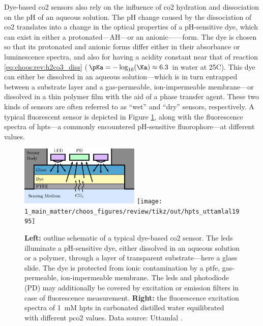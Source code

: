 Dye-based \gls{co2} sensors also rely on the influence of \gls{co2} hydration and dissociation on the pH of an aqueous solution. The pH change caused by the dissociation of \gls{co2} translates into a change in the optical properties of a pH-sensitive dye, which can exist in either a protonated---AH---or an anionic------form. The dye is chosen so that its protonated and anionic forms differ either in their absorbance or luminescence spectra, and also for having a \Ka{} acidity constant near that of reaction \ref{eq:choos:rev:h2co3_diss} ($\pKa=-\log_{10}(\Ka)\approx6.3$ in water at 25{\degree}C\cite{macinnes1933}). This dye can either be dissolved in an aqueous solution---which is in turn entrapped between a substrate layer and a gas-permeable, ion-impermeable membrane---or dissolved in a thin polymer film with the aid of a phase transfer agent. These two kinds of sensors are often referred to as \enquote{wet} and \enquote{dry} sensors, respectively. A typical fluorescent sensor is depicted in Figure \ref{fig:choos:review:dye_based}, along with the fluorescence spectra of \gls{hpts}---a commonly encountered pH-sensitive fluorophore---at different \pH{} values.

\begin{figure}
	\centering
	\includegraphics[valign=c, width=0.51\textwidth]{1_main_matter/choos_figures/review/dye_sensor}
	\hspace{0.2cm}
	\texttt{[image: 1\_main\_matter/choos\_figures/review/tikz/out/hpts\_uttamlal1995]}
	\caption[Dye-based sensors outline.]{\textbf{Left:} outline schematic of a typical dye-based \gls{co2} sensor. The \glspl{led} illuminate a pH-sensitive dye, either dissolved in an aqueous solution or a polymer, through a layer of transparent substrate---here a glass slide. The dye is protected from ionic contamination by a \gls{ptfe}, gas-permeable, ion-impermeable membrane. The \glspl{led} and photodiode (PD) may additionally be covered by excitation or emission filters in case of fluorescence measurement. \textbf{Right:} the fluorescence excitation spectra of 1~mM \gls{hpts} in carbonated distilled water equilibrated with different \gls{pco2} values. Data source: Uttamlal \etal{}\cite{uttamlal1995}.}
	\label{fig:choos:review:dye_based}
\end{figure}

